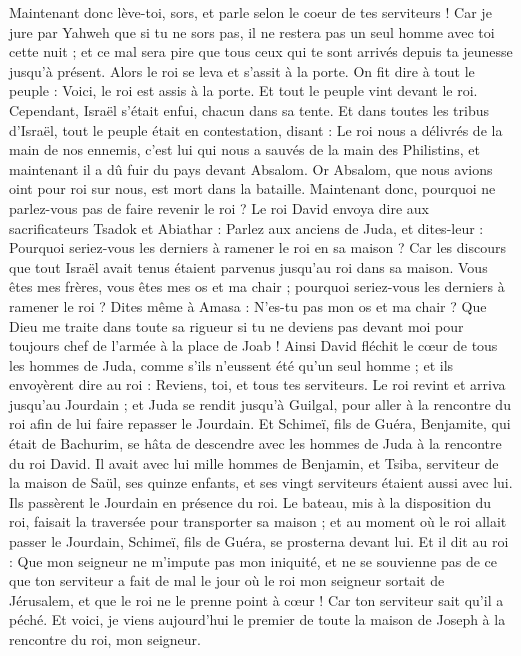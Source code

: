 \begin{multicols}{2}
Maintenant donc lève-toi, sors, et parle selon le coeur de tes serviteurs ! Car je jure par Yahweh que si tu ne sors pas, il ne restera pas un seul homme avec toi cette nuit ; et ce mal sera pire que tous ceux qui te sont arrivés depuis ta jeunesse jusqu'à présent.
Alors le roi se leva et s'assit à la porte. On fit dire à tout le peuple : Voici, le roi est assis à la porte. Et tout le peuple vint devant le roi. Cependant, Israël s’était enfui, chacun dans sa tente.
Et dans toutes les tribus d'Israël, tout le peuple était en contestation, disant : Le roi nous a délivrés de la main de nos ennemis, c'est lui qui nous a sauvés de la main des Philistins, et maintenant il a dû fuir du pays devant Absalom.
Or Absalom, que nous avions oint pour roi sur nous, est mort dans la bataille. Maintenant donc, pourquoi ne parlez-vous pas de faire revenir le roi ?
Le roi David envoya dire aux sacrificateurs Tsadok et Abiathar : Parlez aux anciens de Juda, et dites-leur : Pourquoi seriez-vous les derniers à ramener le roi en sa maison ? Car les discours que tout Israël avait tenus étaient parvenus jusqu'au roi dans sa maison.
Vous êtes mes frères, vous êtes mes os et ma chair ; pourquoi seriez-vous les derniers à ramener le roi ?
Dites même à Amasa : N'es-tu pas mon os et ma chair ? Que Dieu me traite dans toute sa rigueur si tu ne deviens pas devant moi pour toujours chef de l'armée à la place de Joab !
Ainsi David fléchit le cœur de tous les hommes de Juda, comme s'ils n'eussent été qu'un seul homme ; et ils envoyèrent dire au roi : Reviens, toi, et tous tes serviteurs.
Le roi revint et arriva jusqu'au Jourdain ; et Juda se rendit jusqu'à Guilgal, pour aller à la rencontre du roi afin de lui faire repasser le Jourdain.
Et Schimeï, fils de Guéra, Benjamite, qui était de Bachurim, se hâta de descendre avec les hommes de Juda à la rencontre du roi David.
Il avait avec lui mille hommes de Benjamin, et Tsiba, serviteur de la maison de Saül, ses quinze enfants, et ses vingt serviteurs étaient aussi avec lui. Ils passèrent le Jourdain en présence du roi.
Le bateau, mis à la disposition du roi, faisait la traversée pour transporter sa maison ; et au moment où le roi allait passer le Jourdain, Schimeï, fils de Guéra, se prosterna devant lui.
Et il dit au roi : Que mon seigneur ne m'impute pas mon iniquité, et ne se souvienne pas de ce que ton serviteur a fait de mal le jour où le roi mon seigneur sortait de Jérusalem, et que le roi ne le prenne point à cœur !
Car ton serviteur sait qu'il a péché. Et voici, je viens aujourd'hui le premier de toute la maison de Joseph à la rencontre du roi, mon seigneur.

\end{multicols}
